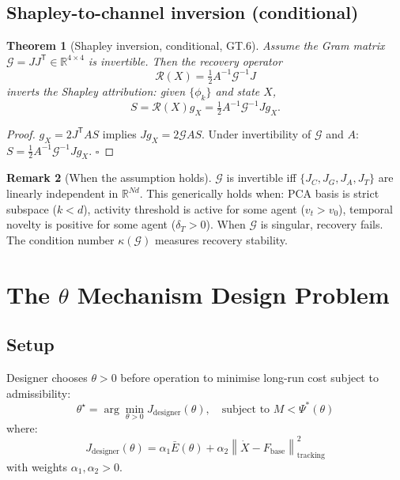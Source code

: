\documentclass[11pt,a4paper]{article}
\newtheorem{theorem}{Theorem}[section]
\theoremstyle{definition}
\newtheorem{remark}[theorem]{Remark}
\newcommand{\R}{\mathbb{R}}
\newcommand{\T}{^{\mathsf{T}}}
\newcommand{\norm}[1]{\left\|#1\right\|}
\newcommand{\Fbase}{F_{\mathrm{base}}}
\newcommand{\gX}{g_X}
\newcommand{\half}{\tfrac{1}{2}}
\begin{document}
\subsection{Shapley-to-channel inversion (conditional)}

\begin{theorem}[Shapley inversion, conditional, GT.6]
\emph{Assume} the Gram matrix $\mathcal{G} = JJ\T \in \R^{4\times 4}$ is invertible.
Then the recovery operator
\[
\mathcal{R}(X) = \half A^{-1}\mathcal{G}^{-1}J
\]
inverts the Shapley attribution: given $\{\phi_k\}$ and state $X$,
\[
S = \mathcal{R}(X)\gX = \half A^{-1}\mathcal{G}^{-1}J\gX.
\]
\end{theorem}

\begin{proof}
$\gX = 2J\T AS$ implies $J\gX = 2\mathcal{G}AS$.
Under invertibility of $\mathcal{G}$ and $A$: $S = \half A^{-1}\mathcal{G}^{-1}J\gX$. $\square$
\end{proof}

\begin{remark}[When the assumption holds]
$\mathcal{G}$ is invertible iff $\{J_C, J_G, J_A, J_T\}$ are linearly independent in $\R^{Nd}$.
This generically holds when:
PCA basis is strict subspace ($k < d$),
activity threshold is active for some agent ($v_t > v_0$),
temporal novelty is positive for some agent ($\delta_T > 0$).
When $\mathcal{G}$ is singular, recovery fails. The condition number $\kappa(\mathcal{G})$ measures recovery stability.
\end{remark}

\section{The $\theta$ Mechanism Design Problem}

\subsection{Setup}

Designer chooses $\theta > 0$ before operation to minimise long-run cost subject to admissibility:
\[
\theta^\star = \arg\min_{\theta>0} J_\text{designer}(\theta), \quad \text{subject to } M < \Psi^*(\theta)
\]
where:
\[
J_\text{designer}(\theta) = \alpha_1\bar E(\theta) + \alpha_2\norm{\dot X - \Fbase}^2_\text{tracking}
\]
with weights $\alpha_1, \alpha_2 > 0$.
\end{document}
